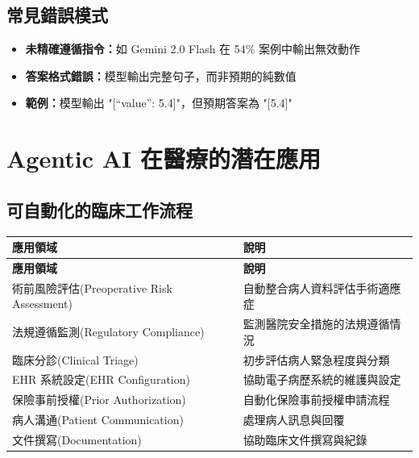\documentclass[12pt,a4paper]{article}
\begin{document}
\subsection{常見錯誤模式}

\begin{itemize}
    \item \textbf{未精確遵循指令：}如 Gemini 2.0 Flash 在 54\% 案例中輸出無效動作
    \item \textbf{答案格式錯誤：}模型輸出完整句子，而非預期的純數值
    \item \textbf{範例：}模型輸出 "[``value'': 5.4]"，但預期答案為 "[5.4]"
\end{itemize}

\section{Agentic AI 在醫療的潛在應用}

\subsection{可自動化的臨床工作流程}

\begin{longtable}{p{4cm}p{10cm}}
\toprule
\textbf{應用領域} & \textbf{說明} \\
\midrule
\endfirsthead

\toprule
\textbf{應用領域} & \textbf{說明} \\
\midrule
\endhead

\bottomrule
\endfoot

術前風險評估\newline (Preoperative Risk Assessment) &
自動整合病人資料評估手術適應症 \\
\midrule

法規遵循監測\newline (Regulatory Compliance) &
監測醫院安全措施的法規遵循情況 \\
\midrule

臨床分診\newline (Clinical Triage) &
初步評估病人緊急程度與分類 \\
\midrule

EHR 系統設定\newline (EHR Configuration) &
協助電子病歷系統的維護與設定 \\
\midrule

保險事前授權\newline (Prior Authorization) &
自動化保險事前授權申請流程 \\
\midrule

病人溝通\newline (Patient Communication) &
處理病人訊息與回覆 \\
\midrule

文件撰寫\newline (Documentation) &
協助臨床文件撰寫與紀錄 \\
\bottomrule
\end{longtable}
\end{document}
